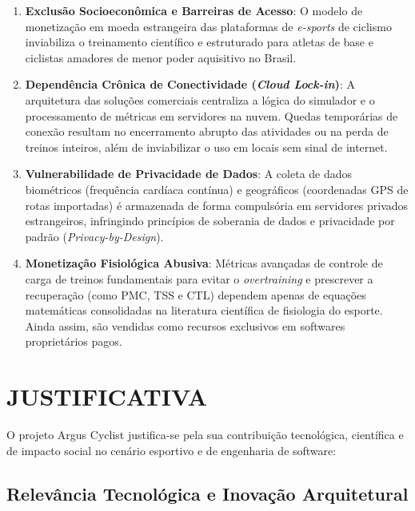 \documentclass[
    a4paper,
    12pt,
    oneside,
    english,
    brazil,
    chapter=TITLE,
    section=TITLE,
]{abntex2}
\begin{document}
\begin{enumerate}
    \item \textbf{Exclusão Socioeconômica e Barreiras de Acesso}: O modelo de monetização em moeda estrangeira das plataformas de \textit{e-sports} de ciclismo inviabiliza o treinamento científico e estruturado para atletas de base e ciclistas amadores de menor poder aquisitivo no Brasil.

    \item \textbf{Dependência Crônica de Conectividade (\textit{Cloud Lock-in})}: A arquitetura das soluções comerciais centraliza a lógica do simulador e o processamento de métricas em servidores na nuvem. Quedas temporárias de conexão resultam no encerramento abrupto das atividades ou na perda de treinos inteiros, além de inviabilizar o uso em locais sem sinal de internet.

    \item \textbf{Vulnerabilidade de Privacidade de Dados}: A coleta de dados biométricos (frequência cardíaca contínua) e geográficos (coordenadas GPS de rotas importadas) é armazenada de forma compulsória em servidores privados estrangeiros, infringindo princípios de soberania de dados e privacidade por padrão (\textit{Privacy-by-Design}).

    \item \textbf{Monetização Fisiológica Abusiva}: Métricas avançadas de controle de carga de treinos fundamentais para evitar o \textit{overtraining} e prescrever a recuperação (como PMC, TSS e CTL) dependem apenas de equações matemáticas consolidadas na literatura científica de fisiologia do esporte. Ainda assim, são vendidas como recursos exclusivos em softwares proprietários pagos.
\end{enumerate}

\chapter{JUSTIFICATIVA}
\label{sec:justificativa}

O projeto Argus Cyclist justifica-se pela sua contribuição tecnológica, científica e de impacto social no cenário esportivo e de engenharia de software:

\section{Relevância Tecnológica e Inovação Arquitetural}
\label{sec:relevancia-tecnologica}
\end{document}
